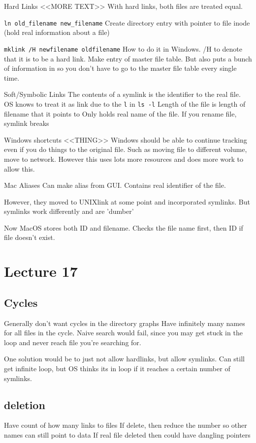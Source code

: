 \documentclass{article}
\begin{document}
		Hard Links
			<<MORE TEXT>>
			With hard links, both files are treated equal.

			\texttt{ln old\_filename new\_filename}
			Create directory entry with pointer to file inode (hold real information about a file)

			\texttt{mklink /H newfilename oldfilename}
			How to do it in Windows.
			/H to denote that it is to be a hard link.
			Make entry of master file table. But also puts a bunch of information in so you don't have to go to the master file table every single time.

		Soft/Symbolic Links
			The contents of a symlink is the identifier to the real file.
			OS knows to treat it as link due to the \texttt{l} in \texttt{ls -l}
			Length of the file is length of filename that it points to
			Only holds real name of the file. If you rename file, symlink breaks

			Windows shortcuts
				<<THING>>
				Windows should be able to continue tracking even if you do things to the original file.
				Such as moving file to different volume, move to network.
				However this uses lots more resources and does more work to allow this.

			Mac Aliases
				Can make alias from GUI.
				Contains real identifier of the file. 

				However, they moved to UNIXlink at some point and incorporated symlinks.
				But symlinks work differently and are 'dumber'

				Now MacOS stores both ID and filename. Checks the file name first, then ID if file doesn't exist.

\section{Lecture 17}
	\subsection{Cycles}
		Generally don't want cycles in the directory graphs
		Have infinitely many names for all files in the cycle.
		Naive search would fail, since you may get stuck in the loop and never reach file you're searching for.

		One solution would be to just not allow hardlinks, but allow symlinks.
		Can still get infinite loop, but OS thinks its in loop if it reaches a certain number of symlinks.

	\subsection{deletion}
		Have count of how many links to files
		If delete, then reduce the number so other names can still point to data
		If real file deleted then could have dangling pointers
\end{document}

